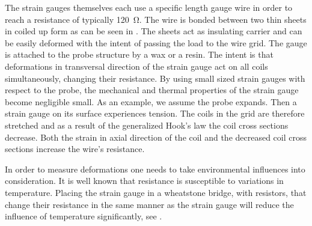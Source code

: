 The strain gauges themselves each use a specific length gauge wire in order to reach a resistance of typically \SI{120}{\ohm}. The wire is bonded between two thin sheets in coiled up form as can be seen in . The sheets act as insulating carrier and can be easily deformed with the intent of passing the load to the wire grid. The gauge is attached to the probe structure by a wax or a resin. The intent is that deformations in transversal direction of the strain gauge act on all coils simultaneously, changing their resistance. By using small sized strain gauges with respect to the probe, the mechanical and thermal properties of the strain gauge become negligible small. As an example, we assume the probe expands. Then a strain gauge on its surface experiences tension. The coils in the grid are therefore stretched and as a result of the generalized Hook's law the coil cross sections decrease. Both the strain in axial direction of the coil and the decreased coil cross sections increase the wire's resistance.

In order to measure deformations one needs to take environmental influences into consideration. It is well known that resistance is susceptible to variations in temperature. Placing the strain gauge in a wheatstone bridge, with resistors, that change their resistance in the same manner as the strain gauge will reduce the influence of temperature significantly, see .

